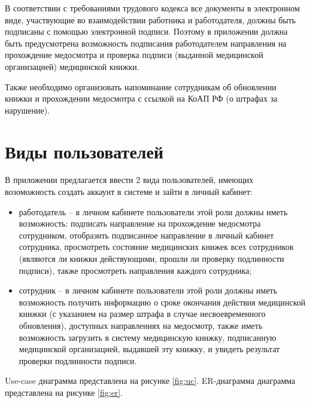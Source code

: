 \documentclass[12pt]{report}
\begin{document}
В соответствии с требованиями трудового кодекса все документы в электронном виде, участвующие во взаимодействии работника и работодателя, должны быть подписаны с помощью электронной подписи.
Поэтому в приложении должна быть предусмотрена возможность подписания работодателем направления на прохождение медосмотра и проверка подписи (выданной медицинской организацией) медицинской книжки. 

Также необходимо организовать напоминание сотрудникам об обновлении книжки и прохождении медосмотра с ссылкой на КоАП РФ (о штрафах за нарушение).

\newpage

\section{Виды пользователей}
В приложении предлагается ввести 2 вида пользователей, имеющих возоможность создать аккаунт в системе и зайти в личный кабинет:
\begin{itemize}
    \item работодатель -- в личном кабинете пользователи этой роли должны иметь возможность: подписать направление на прохождение медосмотра сотрудником, отобразить подписанное направление в личный кабинет сотрудника, просмотреть состояние медицинских книжек всех сотрудников (являются ли книжки действующими, прошли ли проверку подлинности подписи), также просмотреть направления каждого сотрудника;
    \item сотрудник -- в личном кабинете пользователи этой роли должны иметь возможность получить информацию о сроке окончания действия медицинской книжки (с указанием на размер штрафа в случае несвоевременного обновления),  доступных направлениях на медосмотр, также иметь возможность загрузить в систему медицинскую книжку, подписанную медицинской организацией, выдавшей эту книжку, и увидеть результат проверки подлинности подписи.
\end{itemize}

Use-case диаграмма представлена на рисунке \ref{fig:uc}. 
ER-диаграмма диаграмма представлена на рисунке \ref{fig:er}.
\end{document}
